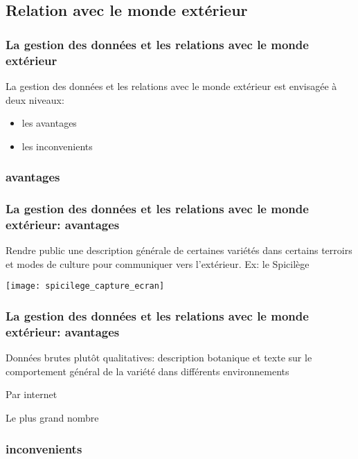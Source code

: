 \subsection{Relation avec le monde extérieur} 

\begin{frame}
\frametitle{La gestion des données et les relations avec le monde extérieur}

La gestion des données et les relations avec le monde extérieur est envisagée à deux niveaux:

\begin{itemize}
\item les avantages
\item les inconvenients
\end{itemize}

\end{frame}

\subsubsection{avantages}
\begin{frame}
\frametitle{La gestion des données et les relations avec le monde extérieur: avantages}

 Rendre public une description générale de certaines variétés dans certains terroirs et modes de culture pour communiquer vers l'extérieur. Ex: le Spicilège

\begin{center}
\texttt{[image: spicilege\_capture\_ecran]}
\end{center}

\end{frame}

\begin{frame}
\frametitle{La gestion des données et les relations avec le monde extérieur: avantages}

Données brutes plutôt qualitatives:
description botanique et texte sur le comportement général de la variété dans différents environnements

\vfill

Par internet

\vfill

Le plus grand nombre

\end{frame}



\subsubsection{inconvenients}

